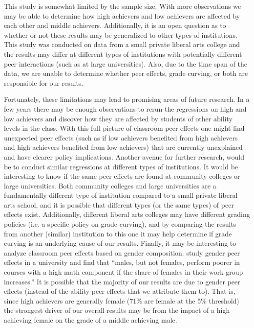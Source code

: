 This study is somewhat limited by the sample size. 
With more observations we may be able to determine how high achievers and low achievers are affected by each other and middle achievers.
Additionally, it is an open question as to whether or not these results may be generalized to other types of institutions. 
This study was conducted on data from a small private liberal arts college and the results may differ at different types of institutions with potentially different peer interactions (such as at large universities). 
Also, due to the time span of the data, we are unable to determine whether peer effects, grade curving, or both are responsible for our results. 

Fortunately, these limitations may lead to promising areas of future research. 
In a few years there may be enough observations to rerun the regressions on high and low achievers and discover how they are affected by students of other ability levels in the class. 
With this full picture of classroom peer effects one might find unexpected peer effects (such as if low achievers benefited from high achievers and high achievers benefited from low achievers) that are currently unexplained and have clearer policy implications.
Another avenue for further research, would be to conduct similar regressions at different types of institutions.
It would be interesting to know if the same peer effects are found at community colleges or large universities. 
Both community colleges and large universities are a fundamentally different type of institution compared to a small private liberal arts school, and it is possible that different types (or the same types) of peer effects exist. 
Additionally, different liberal arts colleges may have different grading policies (i.e. a specific policy on grade curving), and by comparing the results from another (similar) institution to this one it may help determine if grade curving is an underlying cause of our results. 
Finally, it may be interesting to analyze classroom peer effects based on gender composition. 
\citet{oosterbeek2014gender} study gender peer effects in a university and find that ``males, but not females, perform poorer in courses with a high math component if the share of females in their work group increases.'' 
It is possible that the majority of our results are due to gender peer effects (instead of the ability peer effects that we attribute them to). 
That is, since high achievers are generally female (71\% are female at the 5\% threshold) the strongest driver of our overall results may be from the impact of a high achieving female on the grade of a middle achieving male. 

